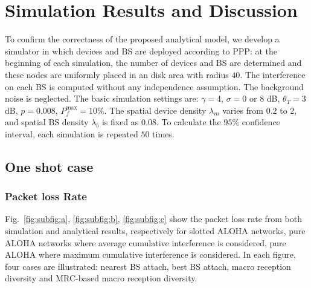 \section{Simulation Results and Discussion}
\label{sec:simulation}
To confirm the correctness of the proposed analytical model, we develop a simulator in which devices and BS are deployed according to PPP: at the beginning of each simulation, the number of devices and BS are determined and these nodes are uniformly placed in an disk area with radius $40$. The interference on each BS is computed without any independence assumption. The background noise is neglected. The basic simulation settings are: $\gamma=4$, $\sigma = 0$ or $8$ dB, $\theta_{T} =3$ dB, $p=0.008$, $P_{f}^{\text{max}}=10\%$. The spatial device density $\lambda_m$ varies from $0.2$ to $2$, and spatial BS density $\lambda_{b}$ is fixed as $0.08$. To calculate the $95\%$ confidence interval, each simulation is repeated $50$ times. 
\subsection{One shot case}
\subsubsection{Packet loss Rate}
Fig.~\ref{fig:subfig:a}, \ref{fig:subfig:b}, \ref{fig:subfig:c} show the packet loss rate from both simulation and analytical results, respectively for slotted ALOHA networks, pure ALOHA networks where average cumulative interference is considered, pure ALOHA where maximum cumulative interference is considered. In each figure, four cases are illustrated: nearest BS attach, best BS attach, macro reception diversity and MRC-based macro reception diversity.

